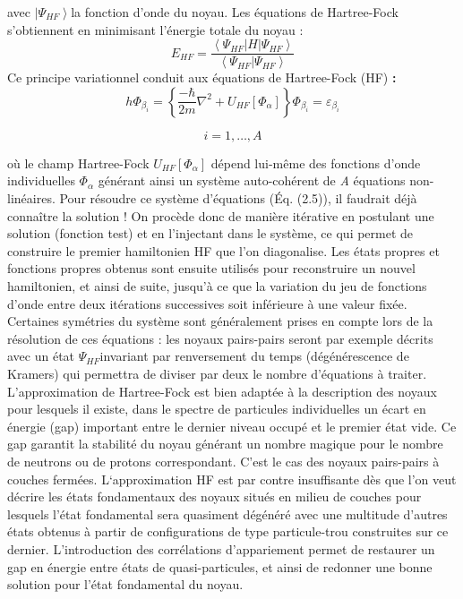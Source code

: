 avec $| \left.\Psi _{\mathit{HF}}\right\rangle $la fonction d'onde du noyau. Les équations de Hartree-Fock
s'obtiennent en minimisant l'énergie totale du noyau :
 \begin{equation}E_{\mathit{HF}}=\frac{\left\langle \Psi _{\mathit{HF}}\left|H\left|\Psi _{\mathit{HF}}\right.\right.\right\rangle
}{\left\langle \Psi _{\mathit{HF}}\left|\Psi _{\mathit{HF}}\right.\right\rangle
}\end{equation}
Ce principe variationnel conduit aux équations de Hartree-Fock (HF) \textbf{:}
 \begin{equation}h\Phi _{\beta _i}=\left\{\frac{-\hbar
}{2m}{\nabla}^2+U_{\mathit{HF}}\left[\Phi _{\alpha }\right]\right\}\Phi _{\beta _i}=\varepsilon _{\beta
_i}\end{equation}

\begin{equation} i=1,{\dots},A 
\end{equation}

où le champ Hartree-Fock $U_{\mathit{HF}}\left[\Phi _{\alpha }\right]$ dépend lui-même des fonctions d'onde
individuelles $\Phi _{\alpha }$ générant ainsi un système auto-cohérent de \textit{A }équations
non-linéaires.
Pour résoudre ce système d'équations (Éq. (2.5)), il faudrait déjà connaître la solution ! On procède donc de manière
itérative en postulant une solution (fonction test) et en l'injectant dans le système, ce qui permet de construire le
premier hamiltonien HF que l'on diagonalise. Les états propres et fonctions propres obtenus sont ensuite utilisés pour
reconstruire un nouvel hamiltonien, et ainsi de suite, jusqu'à ce que la variation du jeu de fonctions d'onde entre
deux itérations successives soit inférieure à une valeur fixée. Certaines symétries du système sont généralement prises
en compte lors de la résolution de ces équations : les noyaux pairs-pairs seront par exemple décrits avec un état
$\Psi _{\mathit{HF}}$invariant par renversement du temps (dégénérescence de Kramers) qui permettra de diviser par
deux le nombre d'équations à traiter.
L'approximation de Hartree-Fock est bien adaptée à la description des noyaux pour lesquels il existe, dans le spectre de
particules individuelles un écart en énergie ({\textquotedbl}gap{\textquotedbl}) important entre le dernier niveau
occupé et le premier état vide. Ce {\textquotedbl}gap{\textquotedbl} garantit la stabilité du noyau générant un nombre
magique pour le nombre de neutrons ou de protons correspondant. C'est le cas des noyaux pairs-pairs à couches fermées.
L‘approximation HF est par contre insuffisante dès que l'on veut décrire les états fondamentaux des noyaux situés en
milieu de couches pour lesquels l'état fondamental sera quasiment dégénéré avec une multitude d'autres états obtenus à
partir de configurations de type particule-trou construites sur ce dernier. L'introduction des corrélations
d'appariement permet de restaurer un {\textquotedbl}gap{\textquotedbl} en énergie entre états de
{\textquotedbl}quasi-particules{\textquotedbl}, et ainsi de redonner une bonne solution pour l'état fondamental du
noyau.

